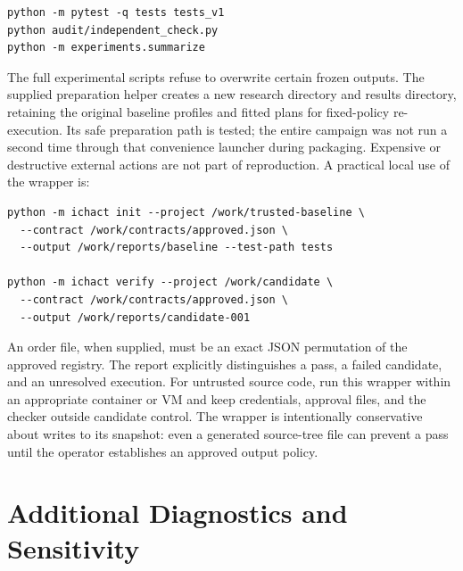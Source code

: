 \begin{verbatim}
python -m pytest -q tests tests_v1
python audit/independent_check.py
python -m experiments.summarize
\end{verbatim}

The full experimental scripts refuse to overwrite certain frozen outputs. The supplied preparation helper creates a new research directory and results directory, retaining the original baseline profiles and fitted plans for fixed-policy re-execution. Its safe preparation path is tested; the entire campaign was not run a second time through that convenience launcher during packaging. Expensive or destructive external actions are not part of reproduction. A practical local use of the wrapper is:
\begin{verbatim}
python -m ichact init --project /work/trusted-baseline \
  --contract /work/contracts/approved.json \
  --output /work/reports/baseline --test-path tests

python -m ichact verify --project /work/candidate \
  --contract /work/contracts/approved.json \
  --output /work/reports/candidate-001
\end{verbatim}

An order file, when supplied, must be an exact JSON permutation of the approved registry. The report explicitly distinguishes a pass, a failed candidate, and an unresolved execution. For untrusted source code, run this wrapper within an appropriate container or VM and keep credentials, approval files, and the checker outside candidate control. The wrapper is intentionally conservative about writes to its snapshot: even a generated source-tree file can prevent a pass until the operator establishes an approved output policy.

\section{Additional Diagnostics and Sensitivity}




\clearpage
